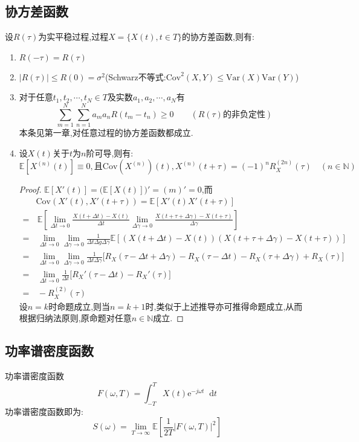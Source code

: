 \documentclass{elegantbook}
\newcommand\var{\text{Var}}
\newcommand\cov{\text{Cov}}
\renewcommand\d{\mathop{}\!\mathrm{d}}
\newcommand\e{\mathrm{e}}
\newcommand\E{\mathbb{E}}
\begin{document}
\subsection{协方差函数}
\begin{proposition}{}{}
	设$R(\tau )$为实平稳过程,过程$X=\{X(t),t\in T\}$的协方差函数,则有:
	\begin{enumerate}[label=(\alph*)]
		\item $R(-\tau)=R(\tau )$
		\item $|R(\tau)|\leq R(0) = \sigma^2$\quad (Schwarz不等式:$\cov^2(X,Y)\leq \var(X)\var(Y)$)
		\item 对于任意$t_1,t_2,\cdots ,t_N\in T$及实数$a_1,a_2,\cdots ,a_N$有
					\[\sum_{m=1}^{N}\sum_{n=1}^{N}a_m a_n R(t_m-t_n)\geq 0\qquad (R(\tau)\text{的非负定性})\]
					本条见第一章,对任意过程的协方差函数都成立.
		\item 设$X(t)$关于$t$为$n$阶可导,则有:
					\[\E[X^{(n)}(t)] \equiv 0,\text{且}\cov(X^{(n)})(t),X^{(n)}(t+\tau) = (-1)^n R_{X}^{(2n)}(\tau)\quad (n\in \mathbb{N})\]
					\begin{proof}
						$\E[X'(t)] = \big(\E[X(t)]\big)' = (m)' = 0$,而
						\[\begin{split}
							& \cov(X'(t),X'(t+\tau)) = \E[X'(t)X'(t+\tau)]\\
							= &\,\E\left[\lim_{\Delta t \to 0}\frac{X(t+\Delta t)-X(t)}{\Delta t}\lim_{\Delta \gamma \to 0}\frac{X(t+\tau+\Delta \gamma)-X(t+\tau)}{\Delta \gamma}\right]\\
							= &\,\lim_{\Delta t \to 0}\lim_{\Delta \gamma \to 0}\frac{1}{\Delta t\Delta g\Delta \gamma}\E[(X(t+\Delta t)-X(t))(X(t+\tau+\Delta \gamma)-X(t+\tau))]\\
							= &\,\lim_{\Delta t \to 0}\lim_{\Delta \gamma \to 0}\frac{1}{\Delta t\Delta \gamma}\big[R_{X}(\tau-\Delta t+\Delta \gamma)-R_{X}(\tau-\Delta t)-R_{X}(\tau+\Delta \gamma)+R_{X}(\tau)\big]\\
							= &\,\lim_{\Delta t \to 0}\frac{1}{\Delta t}\big[R_{X}'(\tau-\Delta t)-R_{X}'(\tau)\big]\\
							= &\,-R_{X}^{(2)}(\tau)
						\end{split}\]
						设$n=k$时命题成立,则当$n=k+1$时,类似于上述推导亦可推得命题成立,从而根据归纳法原则,原命题对任意$n\in \mathbb{N}$成立.
					\end{proof}
	\end{enumerate}
\end{proposition}

\subsection{功率谱密度函数}
\begin{definition}{功率谱密度函数}{}
	\[F(\omega,T)=\int_{-T}^{T}X(t)\e^{-j\omega t}\d t\]
	功率谱密度函数即为:
	\[S(\omega)=\lim_{T \to \infty}\E\left[\frac{1}{2T}\left|F(\omega,T)\right|^2\right]\]
\end{definition}
\end{document}
